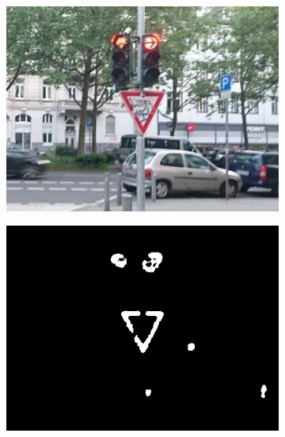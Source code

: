 \documentclass{report}
\begin{document}
\begin{figure}
  \begin{subfigure}[t]{0.5\textwidth}
    \includegraphics[width=1\textwidth]{src/closing_0}
  \end{subfigure}
  \quad
  \begin{subfigure}[t]{0.5\textwidth}
    \includegraphics[width=1\textwidth]{src/closing_1}
  \end{subfigure}
  \begin{subfigure}[t]{0.5\textwidth}

\end{subfigure}
\end{figure}
\end{document}
